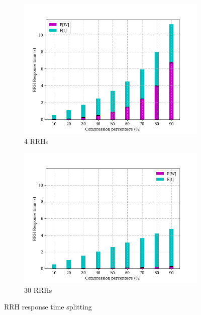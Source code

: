 \documentclass[11pt,a4paper,oneside, openright]{article}
\begin{document}
\begin{figure}[H]
	\centering
	\begin{subfigure}{.5\textwidth}
		\centering
		\includegraphics[width=\linewidth]{images/response-time-rrh-ratio-4}
		\caption{4 RRHs}
		\label{fig:response-time-rrh-ratio-4}
	\end{subfigure}%
	\begin{subfigure}{.5\textwidth}
		\centering
		\includegraphics[width=\linewidth]{images/response-time-rrh-ratio-30}
		\caption{30 RRHs}
		\label{fig:response-time-rrh-ratio-30}
	\end{subfigure}
	\caption{RRH response time splitting}
	\label{fig:response-time-rrh-ratio}
\end{figure}
\end{document}
